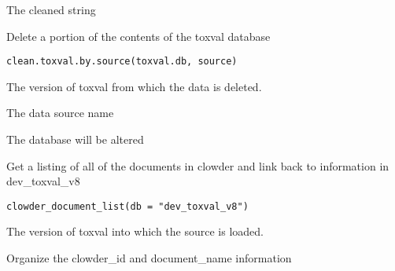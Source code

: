 \documentclass[letterpaper]{book}
\begin{document}
%
\begin{Value}
The cleaned string
\end{Value}
%
\begin{Description}\relax
Delete a portion of the contents of the toxval database
\end{Description}
%
\begin{Usage}
\begin{verbatim}
clean.toxval.by.source(toxval.db, source)
\end{verbatim}
\end{Usage}
%
\begin{Arguments}
\begin{ldescription}
\item[\code{toxval.db}] The version of toxval from which the data is deleted.

\item[\code{source}] The data source name
\end{ldescription}
\end{Arguments}
%
\begin{Value}
The database will be altered
\end{Value}
%
\begin{Description}\relax
Get a listing of all of the documents in clowder and link back to information in
dev\_toxval\_v8
\end{Description}
%
\begin{Usage}
\begin{verbatim}
clowder_document_list(db = "dev_toxval_v8")
\end{verbatim}
\end{Usage}
%
\begin{Arguments}
\begin{ldescription}
\item[\code{db}] The version of toxval into which the source is loaded.
\end{ldescription}
\end{Arguments}
%
\begin{Description}\relax
Organize the clowder\_id and document\_name information
\end{Description}
\end{document}
